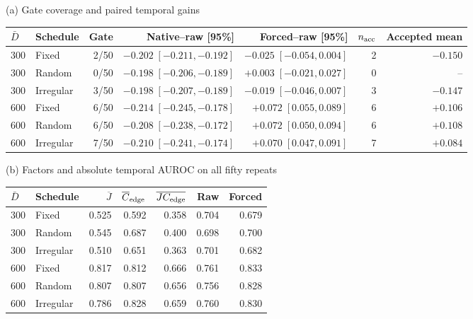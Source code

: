 \begin{minipage}{\linewidth}
\centering\small
(a) Gate coverage and paired temporal gains\par\medskip
\begin{tabular}{llrrrrr}
\toprule
$\bar D$ & Schedule & Gate & Native--raw [95\%] & Forced--raw [95\%] & $n_{\rm acc}$ & Accepted mean \\
\midrule
300 & Fixed & 2/50 & $-0.202\;[-0.211,-0.192]$ & $-0.025\;[-0.054,0.004]$ & 2 & $-0.150$ \\
300 & Random & 0/50 & $-0.198\;[-0.206,-0.189]$ & $+0.003\;[-0.021,0.027]$ & 0 & -- \\
300 & Irregular & 3/50 & $-0.198\;[-0.207,-0.189]$ & $-0.019\;[-0.046,0.007]$ & 3 & $-0.147$ \\
600 & Fixed & 6/50 & $-0.214\;[-0.245,-0.178]$ & $+0.072\;[0.055,0.089]$ & 6 & $+0.106$ \\
600 & Random & 6/50 & $-0.208\;[-0.238,-0.172]$ & $+0.072\;[0.050,0.094]$ & 6 & $+0.108$ \\
600 & Irregular & 7/50 & $-0.210\;[-0.241,-0.174]$ & $+0.070\;[0.047,0.091]$ & 7 & $+0.084$ \\
\bottomrule
\end{tabular}
\par\bigskip
(b) Factors and absolute temporal AUROC on all fifty repeats\par\medskip
\begin{tabular}{llrrrrr}
\toprule
$\bar D$ & Schedule & $\overline J$ & $\overline C_{\rm edge}$ & $\overline{JC_{\rm edge}}$ & Raw & Forced \\
\midrule
300 & Fixed & 0.525 & 0.592 & 0.358 & 0.704 & 0.679 \\
300 & Random & 0.545 & 0.687 & 0.400 & 0.698 & 0.700 \\
300 & Irregular & 0.510 & 0.651 & 0.363 & 0.701 & 0.682 \\
600 & Fixed & 0.817 & 0.812 & 0.666 & 0.761 & 0.833 \\
600 & Random & 0.807 & 0.807 & 0.656 & 0.756 & 0.828 \\
600 & Irregular & 0.786 & 0.828 & 0.659 & 0.760 & 0.830 \\
\bottomrule
\end{tabular}
\end{minipage}
